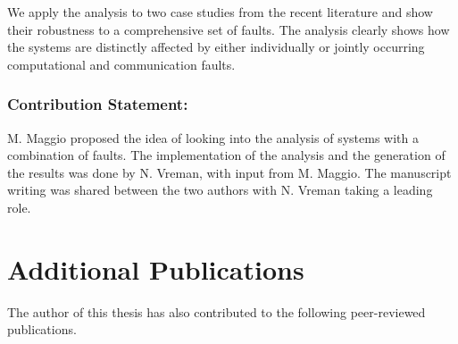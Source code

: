 We apply the analysis to two case studies from the recent literature and show their robustness to a comprehensive set of faults.
The analysis clearly shows how the systems are distinctly affected by either individually or jointly occurring computational and communication faults.


\subsubsection*{Contribution Statement:}%
%
M. Maggio proposed the idea of looking into the analysis of systems with a combination of faults.
The implementation of the analysis and the generation of the results was done by N. Vreman, with input from M. Maggio.
The manuscript writing was shared between the two authors with N. Vreman taking a leading role.


\section{Additional Publications}%
\label{sec:additional-publications}%
%
The author of this thesis has also contributed to the following peer-reviewed publications.

\begin{quote}
\end{quote}

\begin{quote}
\end{quote}

\begin{quote}
\end{quote}

\begin{quote}
\end{quote}

\begin{quote}
\end{quote}

\begin{quote}
\end{quote}
